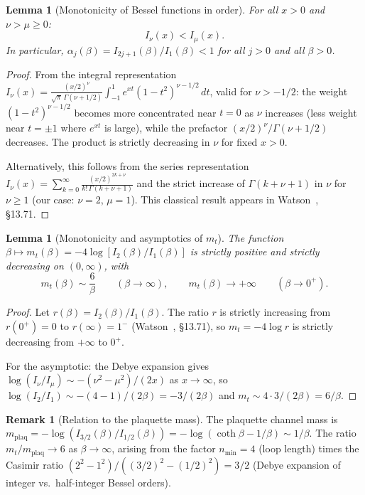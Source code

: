 \documentclass[11pt]{article}
\newtheorem{lemma}[theorem]{Lemma}
\theoremstyle{definition}
\newtheorem{remark}[theorem]{Remark}
\begin{document}
\begin{lemma}[Monotonicity of Bessel functions in order]
\label{lem:bessel}
For all $x>0$ and $\nu>\mu\ge 0$:
\begin{equation}\label{eq:bessel-ineq}
I_\nu(x)<I_\mu(x).
\end{equation}
In particular, $\alpha_j(\beta)=I_{2j+1}(\beta)/I_1(\beta)<1$ for
all $j>0$ and all $\beta>0$.
\end{lemma}

\begin{proof}
From the integral representation
$I_\nu(x)=\frac{(x/2)^\nu}{\sqrt{\pi}\,\Gamma(\nu+1/2)}
\int_{-1}^1 e^{xt}(1-t^2)^{\nu-1/2}\,dt$,
valid for $\nu>-1/2$: the weight $(1-t^2)^{\nu-1/2}$ becomes more
concentrated near $t=0$ as $\nu$ increases (less weight near $t=\pm 1$
where $e^{xt}$ is large), while the prefactor
$(x/2)^\nu/\Gamma(\nu+1/2)$ decreases.  The product is strictly
decreasing in $\nu$ for fixed $x>0$.

Alternatively, this follows from the series representation
$I_\nu(x)=\sum_{k=0}^\infty\frac{(x/2)^{2k+\nu}}{k!\,\Gamma(k+\nu+1)}$
and the strict increase of $\Gamma(k+\nu+1)$ in $\nu$ for $\nu\ge 1$
(our case: $\nu=2$, $\mu=1$).  This classical result appears in
Watson~\cite{Watson44}, \S13.71.
\end{proof}

\begin{lemma}[Monotonicity and asymptotics of $m_t$]
\label{lem:mt-monotone}
The function $\beta\mapsto m_t(\beta)=-4\log[I_2(\beta)/I_1(\beta)]$
is strictly positive and strictly decreasing on $(0,\infty)$, with
\begin{equation}
m_t(\beta)\sim\frac{6}{\beta}\qquad(\beta\to\infty),
\qquad m_t(\beta)\to+\infty\qquad(\beta\to 0^+).
\end{equation}
\end{lemma}

\begin{proof}
Let $r(\beta)=I_2(\beta)/I_1(\beta)$.  The ratio $r$ is strictly
increasing from $r(0^+)=0$ to $r(\infty)=1^-$
(Watson~\cite{Watson44}, \S13.71), so $m_t=-4\log r$ is strictly
decreasing from $+\infty$ to $0^+$.

For the asymptotic: the Debye expansion gives
$\log(I_\nu/I_\mu)\sim-(\nu^2-\mu^2)/(2x)$ as $x\to\infty$, so
$\log(I_2/I_1)\sim-(4-1)/(2\beta)=-3/(2\beta)$ and
$m_t\sim 4\cdot 3/(2\beta)=6/\beta$.
\end{proof}

\begin{remark}[Relation to the plaquette mass]
The plaquette channel mass is
$m_{\mathrm{plaq}}=-\log(I_{3/2}(\beta)/I_{1/2}(\beta))
=-\log(\coth\beta-1/\beta)\sim 1/\beta$.
The ratio $m_t/m_{\mathrm{plaq}}\to 6$ as $\beta\to\infty$, arising
from the factor $n_{\min}=4$ (loop length) times the Casimir ratio
$(2^2-1^2)/((3/2)^2-(1/2)^2)=3/2$ (Debye expansion of integer vs.\
half-integer Bessel orders).
\end{remark}
\end{document}
